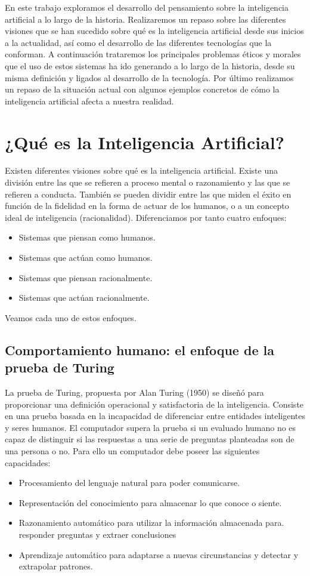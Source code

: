 \documentclass[12pt,a4paper]{article}
\begin{document}
En este trabajo exploramos el desarrollo del pensamiento sobre la inteligencia artificial a lo largo de la historia. Realizaremos un repaso sobre las diferentes visiones que se han sucedido sobre qué es la inteligencia artificial desde sus inicios a la actualidad, así como el desarrollo de las diferentes tecnologías que la conforman. A continuación trataremos los principales problemas éticos y morales que el uso de estos sistemas ha ido generando a lo largo de la historia, desde su misma definición y ligados al desarrollo de la tecnología. Por último realizamos un repaso de la situación actual con algunos ejemplos concretos de cómo la inteligencia artificial afecta a nuestra realidad.

\section{¿Qué es la Inteligencia Artificial?}

Existen diferentes visiones sobre qué es la inteligencia artificial. Existe una división entre las que se refieren a proceso mental o razonamiento y las que se refieren a conducta. También se pueden dividir entre las que miden el éxito en función de la fidelidad en la forma de actuar de los humanos, o a un concepto ideal de inteligencia (racionalidad). Diferenciamos por tanto cuatro enfoques:

\begin{itemize}
\item Sistemas que piensan como humanos.
\item Sistemas que actúan como humanos.
\item Sistemas que piensan racionalmente.
\item Sistemas que actúan racionalmente.
\end{itemize}
Veamos cada uno de estos enfoques.

\subsection{Comportamiento humano: el enfoque de la prueba de Turing}

La prueba de Turing, propuesta por Alan Turing (1950) se diseñó para proporcionar una definición operacional y satisfactoria de la inteligencia. Consiste en una prueba basada en la incapacidad de diferenciar entre entidades inteligentes y seres humanos. El computador supera la prueba si un evaluado humano no es capaz de distinguir si las respuestas a una serie de preguntas planteadas son de una persona o no. Para ello un computador debe poseer las siguientes capacidades:
\begin{itemize}
\item Procesamiento del lenguaje natural para poder comunicarse.
\item Representación del conocimiento para almacenar lo que conoce o siente.
\item Razonamiento automático para utilizar la información almacenada para. responder preguntas y extraer conclusiones
\item Aprendizaje automático para adaptarse a nuevas circunstancias y detectar y extrapolar patrones.
\end{itemize}
\end{document}
